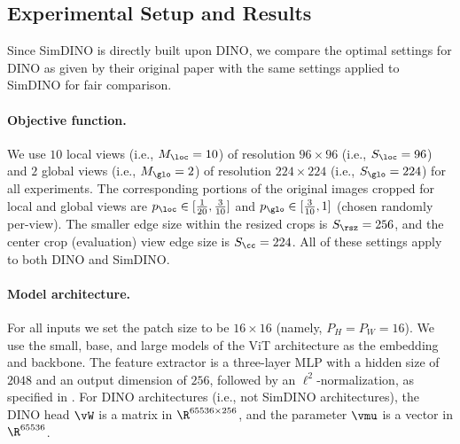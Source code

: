 \documentclass[../../book-main.tex]{subfiles}
\begin{document}
\subsection{Experimental Setup and Results} \label{sub:contrastive_learning_experiment_results}

Since SimDINO is directly built upon DINO, we compare the optimal settings for DINO as given by their original paper \citep{caron2021emerging} with the same settings applied to SimDINO for fair comparison. 

\paragraph{Objective function.} We use \(10\) local views (i.e., \(M_{\loc} = 10\)) of resolution \(96 \times 96\) (i.e., \(S_{\loc} = 96\)) and \(2\) global views (i.e., \(M_{\glo} = 2\)) of resolution \(224 \times 224\) (i.e., \(S_{\glo} = 224\)) for all experiments. The corresponding portions of the original images cropped for local and global views are \(p_{\loc} \in [\frac{1}{20}, \frac{3}{10}]\) and \(p_{\glo} \in [\frac{3}{10}, 1]\) (chosen randomly per-view). The smaller edge size within the resized crops is \(S_{\rsz} = 256\), and the center crop (evaluation) view edge size is \(S_{\cc} = 224\). All of these settings apply to both DINO and SimDINO.

\paragraph{Model architecture.} For all inputs we set the patch size to be \(16 \times 16\) (namely, \(P_{H} = P_{W} = 16\)). We use the small, base, and large models of the ViT \citep{dosovitskiy2020image} architecture as the embedding and backbone. The feature extractor is a three-layer MLP with a hidden size of \(2048\) and an output dimension of \(256\), followed by an \(\ell^{2}\)-normalization, as specified in . For DINO architectures (i.e., not SimDINO architectures), the DINO head \(\vW\) is a matrix in \(\R^{65536 \times 256}\), and the parameter \(\vmu\) is a vector in \(\R^{65536}\). 
\end{document}
